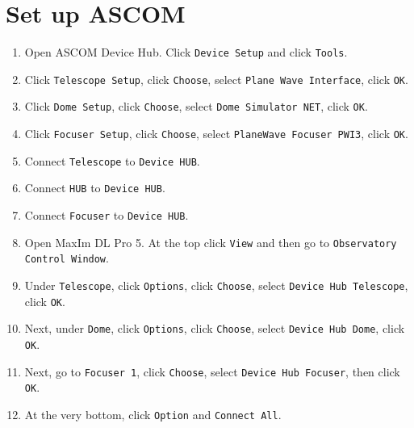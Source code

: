 \documentclass{article}
\begin{document}
	\newpage

	\newpage
	\appendix
	
	\section{Set up ASCOM}
	\label{sec:set-up-ascom}
	
	\begin{enumerate}
		
		\item Open ASCOM Device Hub. Click \texttt{Device Setup} and click \texttt{Tools}.
		
		\item Click \texttt{Telescope Setup}, click \texttt{Choose}, select \texttt{Plane Wave Interface}, click \texttt{OK}.
		
		\item Click \texttt{Dome Setup}, click \texttt{Choose}, select \texttt{Dome Simulator NET}, click \texttt{OK}. 
		
		\item Click \texttt{Focuser Setup}, click \texttt{Choose}, select \texttt{PlaneWave Focuser PWI3}, click \texttt{OK}. 
		
		\item Connect \texttt{Telescope} to \texttt{Device HUB}. 
		
		\item Connect \texttt{HUB} to \texttt{Device HUB}. 
		
		\item Connect \texttt{Focuser} to \texttt{Device HUB}. 
		
		\item Open MaxIm DL Pro 5. At the top click \texttt{View} and then go to \texttt{Observatory Control Window}. 
		
		\item Under \texttt{Telescope}, click \texttt{Options}, click \texttt{Choose}, select \texttt{Device Hub Telescope}, click \texttt{OK}. 
		
		\item Next, under \texttt{Dome}, click \texttt{Options}, click \texttt{Choose}, select \texttt{Device Hub Dome}, click \texttt{OK}. 
		
		\item Next, go to \texttt{Focuser 1}, click \texttt{Choose}, select \texttt{Device Hub Focuser}, then click \texttt{OK}. 
		
		\item At the very bottom, click \texttt{Option} and \texttt{Connect All}. 
		

\end{enumerate}
\end{document}
